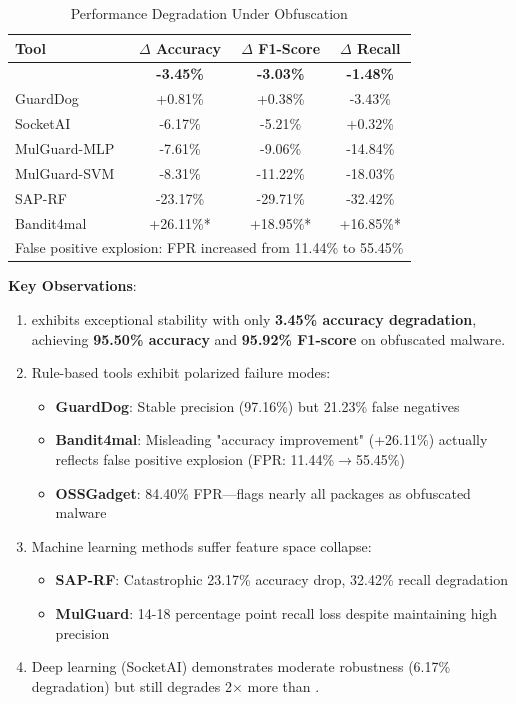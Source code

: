 \begin{table}[h]
\centering
\caption{Performance Degradation Under Obfuscation}
\label{tab:rq2-degradation}
\small
\begin{tabular}{lccc}
\toprule
\textbf{Tool} & \textbf{$\Delta$ Accuracy} & \textbf{$\Delta$ F1-Score} & \textbf{$\Delta$ Recall} \\
\midrule
\textbf{\tool{}} & \textbf{-3.45\%} & \textbf{-3.03\%} & \textbf{-1.48\%} \\
GuardDog & +0.81\% & +0.38\% & -3.43\% \\
SocketAI & -6.17\% & -5.21\% & +0.32\% \\
MulGuard-MLP & -7.61\% & -9.06\% & -14.84\% \\
MulGuard-SVM & -8.31\% & -11.22\% & -18.03\% \\
SAP-RF & -23.17\% & -29.71\% & -32.42\% \\
Bandit4mal & +26.11\%* & +18.95\%* & +16.85\%* \\
\bottomrule
\multicolumn{4}{l}{\small *False positive explosion: FPR increased from 11.44\% to 55.45\%}
\end{tabular}
\end{table}

\textbf{Key Observations}:
\begin{enumerate}
    \item \tool{} exhibits exceptional stability with only \textbf{3.45\% accuracy degradation}, achieving \textbf{95.50\% accuracy} and \textbf{95.92\% F1-score} on obfuscated malware.
    
    \item Rule-based tools exhibit polarized failure modes:
    \begin{itemize}
        \item \textbf{GuardDog}: Stable precision (97.16\%) but 21.23\% false negatives
        \item \textbf{Bandit4mal}: Misleading "accuracy improvement" (+26.11\%) actually reflects false positive explosion (FPR: 11.44\%$\rightarrow$55.45\%)
        \item \textbf{OSSGadget}: 84.40\% FPR---flags nearly all packages as obfuscated malware
    \end{itemize}
    
    \item Machine learning methods suffer feature space collapse:
    \begin{itemize}
        \item \textbf{SAP-RF}: Catastrophic 23.17\% accuracy drop, 32.42\% recall degradation
        \item \textbf{MulGuard}: 14-18 percentage point recall loss despite maintaining high precision
    \end{itemize}
    
    \item Deep learning (SocketAI) demonstrates moderate robustness (6.17\% degradation) but still degrades 2$\times$ more than \tool{}.
\end{enumerate}


